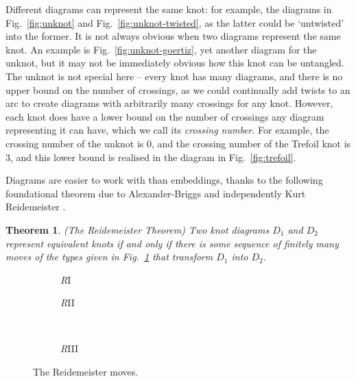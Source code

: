 \documentclass[12pt]{report}
\newtheorem*{theorem}{Theorem}
\begin{document}
Different diagrams can represent the same knot: for example, the diagrams in Fig.~\ref{fig:unknot} and Fig.~\ref{fig:unknot-twisted}, as the latter could be `untwisted' into the former. It is not always obvious when two diagrams represent the same knot. An example is Fig.~\ref{fig:unknot-goertiz}, yet another diagram for the unknot, but it may not be immediately obvious how this knot can be untangled. The unknot is not special here -- every knot has many diagrams, and there is no upper bound on the number of crossings, as we could continually add twists to an arc to create diagrams with arbitrarily many crossings for any knot. However, each knot does have a lower bound on the number of crossings any diagram representing it can have, which we call its \textit{crossing number}. For example, the crossing number of the unknot is $0$, and the crossing number of the Trefoil knot is $3$, and this lower bound is realised in the diagram in Fig.~\ref{fig:trefoil}.

Diagrams are easier to work with than embeddings, thanks to the following foundational theorem due to Alexander-Briggs  \cite{types-of-knotted-curves} and independently Kurt Reidemeister \cite{elementary-justification-knot-theory}.
\begin{theorem}(The Reidemeister Theorem)
Two knot diagrams $D_{1}$ and $D_{2}$ represent equivalent knots if and only if there is some sequence of finitely many moves of the types given in Fig.~\ref{fig:reidemeister_moves} that transform $D_{1}$ into $D_{2}$.
\end{theorem}

\begin{figure}[hbt!]
	\centering
	\hspace*{\fill}
	\begin{subfigure}[b]{0.35 \textwidth}
		\centering
		\def\svgscale{0.22}
		
		\caption{\textit{R}I}
	\end{subfigure}
	\hspace*{\fill}
	\begin{subfigure}[b]{0.35 \textwidth}
		\centering
		\def\svgscale{0.22}
		
		\caption{\textit{R}II}
	\end{subfigure}
	\hspace*{\fill}
	\\
	\hspace*{\fill}
	\begin{subfigure}[b]{0.35 \textwidth}
		\centering
		\def\svgscale{0.22}
		
		\caption{\textit{R}III}
	\end{subfigure}
	\hspace*{\fill}
	\caption{The Reidemeister moves.}
	\label{fig:reidemeister_moves}
\end{figure}
\end{document}
